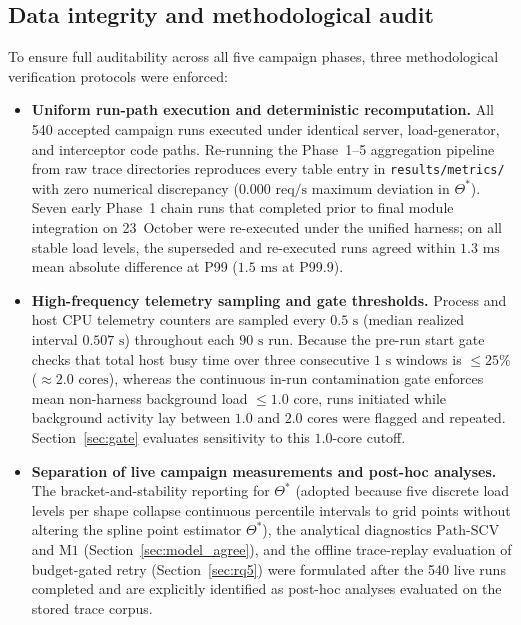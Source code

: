\subsection{Data integrity and methodological audit}
\label{sec:audit}
\label{sec:changes}
To ensure full auditability across all five campaign phases, three methodological verification protocols were enforced:
\begin{itemize}
    \item \textbf{Uniform run-path execution and deterministic recomputation.} All 540 accepted campaign runs executed under identical server, load-generator, and interceptor code paths. Re-running the Phase~1--5 aggregation pipeline from raw trace directories reproduces every table entry in \texttt{results/metrics/} with zero numerical discrepancy ($0.000\text{ req/s}$ maximum deviation in $\Theta^*$). Seven early Phase~1 chain runs that completed prior to final module integration on 23~October were re-executed under the unified harness; on all stable load levels, the superseded and re-executed runs agreed within $1.3\text{ ms}$ mean absolute difference at P99 ($1.5\text{ ms}$ at P99.9).
    \item \textbf{High-frequency telemetry sampling and gate thresholds.} Process and host CPU telemetry counters are sampled every $0.5\text{ s}$ (median realized interval $0.507\text{ s}$) throughout each $90\text{ s}$ run. Because the pre-run start gate checks that total host busy time over three consecutive $1\text{ s}$ windows is $\le 25\%$ ($\approx 2.0\text{ cores}$), whereas the continuous in-run contamination gate enforces mean non-harness background load $\le 1.0\text{ core}$, runs initiated while background activity lay between $1.0$ and $2.0\text{ cores}$ were flagged and repeated. Section~\ref{sec:gate} evaluates sensitivity to this $1.0$-core cutoff.
    \item \textbf{Separation of live campaign measurements and post-hoc analyses.} The bracket-and-stability reporting for $\Theta^*$ (adopted because five discrete load levels per shape collapse continuous percentile intervals to grid points without altering the spline point estimator $\Theta^*$), the analytical diagnostics $\text{Path-SCV}$ and $\text{M1}$ (Section~\ref{sec:model_agree}), and the offline trace-replay evaluation of budget-gated retry (Section~\ref{sec:rq5}) were formulated after the 540 live runs completed and are explicitly identified as post-hoc analyses evaluated on the stored trace corpus.
\end{itemize}

